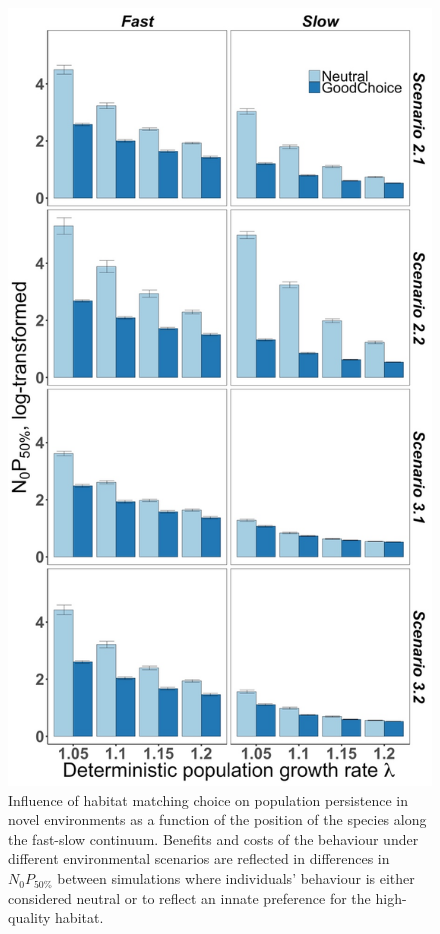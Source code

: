 \begin{figure}
\centering
\includegraphics[height=.75\textheight]{./Figures/Appendix3_2/Fig_6.jpg}
\caption[Effects of \textit{GoodChoice} on $N_{0}P_{50\%}$]{
Influence of habitat matching choice on population persistence in novel
environments as a function of the position of the species along the fast-slow
continuum. Benefits and costs of the behaviour under different environmental
scenarios are reflected in differences in $N_{0}P_{50\%}$ between simulations
where individuals’ behaviour is either considered neutral or to reflect an
innate preference for the high-quality habitat.}
\label{fig:figApp3.2.6}
\end{figure}

